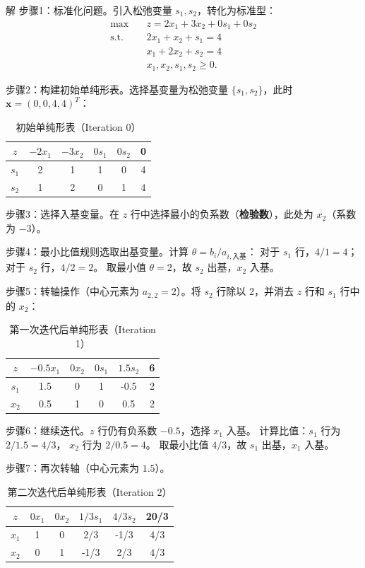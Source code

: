 \documentclass[12pt]{article}
\theoremstyle{plain}
\theoremstyle{definition}
\newenvironment{slv}[1][解]{\begin{paragraph}{#1}\mbox{}}{\end{paragraph}\par\nopagebreak}
\newcommand{\st}{\mathrel{\text{s.t.}}}
\begin{document}
\begin{slv}
步骤1：标准化问题。引入松弛变量 $s_1, s_2$，转化为标准型：
\begin{align*}
    \max \quad & z=2x_1+3x_2+0s_1+0s_2 \\
    \st \quad & 2x_1 + x_2 + s_1 = 4 \\
     & x_1 + 2x_2 + s_2 = 4 \\
     & x_1,x_2,s_1,s_2 \geq 0.
\end{align*}

步骤2：构建初始单纯形表。选择基变量为松弛变量 $\{s_1, s_2\}$，此时 $\bm{x} = (0,0,4,4)^T$：
\begin{table}[!htbp]
    \centering
    \caption{初始单纯形表（Iteration 0）}
    \begin{tabular}{c|cccc|c}
        \hline
        $z$ & $-2x_1$ & $-3x_2$ & $0s_1$ & $0s_2$ & 0 \\
        \hline
        $s_1$ & 2 & 1 & 1 & 0 & 4 \\
        $s_2$ & 1 & 2 & 0 & 1 & 4 \\
        \hline
    \end{tabular}
\end{table}

步骤3：选择入基变量。在 $z$ 行中选择最小的负系数（\textbf{检验数}），此处为 $x_2$（系数为 $-3$）。

步骤4：最小比值规则选取出基变量。计算 $\theta = b_i / a_{i, \text{入基}}$：
对于 $s_1$ 行，$4/1 = 4$；对于 $s_2$ 行，$4/2 = 2$。
取最小值 $\theta=2$，故 $s_2$ 出基，$x_2$ 入基。

步骤5：转轴操作（中心元素为 $a_{2,2}=2$）。将 $s_2$ 行除以 2，并消去 $z$ 行和 $s_1$ 行中的 $x_2$：
\begin{table}[!htbp]
    \centering
    \caption{第一次迭代后单纯形表（Iteration 1）}
    \begin{tabular}{c|cccc|c}
        \hline
        $z$ & $-0.5x_1$ & $0x_2$ & $0s_1$ & $1.5s_2$ & 6 \\
        \hline
        $s_1$ & 1.5 & 0 & 1 & -0.5 & 2 \\
        $x_2$ & 0.5 & 1 & 0 & 0.5 & 2  \\
        \hline
    \end{tabular}
\end{table}

步骤6：继续迭代。$z$ 行仍有负系数 $-0.5$，选择 $x_1$ 入基。
计算比值：$s_1$ 行为 $2/1.5 = 4/3$， $x_2$ 行为 $2/0.5 = 4$。
取最小比值 $4/3$，故 $s_1$ 出基，$x_1$ 入基。

步骤7：再次转轴（中心元素为 $1.5$）。
\begin{table}[!htbp]
    \centering
    \caption{第二次迭代后单纯形表（Iteration 2）}
    \begin{tabular}{c|cccc|c}
        \hline
        $z$ & $0x_1$ & $0x_2$ & $1/3s_1$ & $4/3s_2$ & 20/3 \\
        \hline
        $x_1$ & 1 & 0 & 2/3 & -1/3 & 4/3 \\
        $x_2$ & 0 & 1 & -1/3 & 2/3 & 4/3  \\
        \hline
    \end{tabular}
\end{table}


\end{slv}
\end{document}

